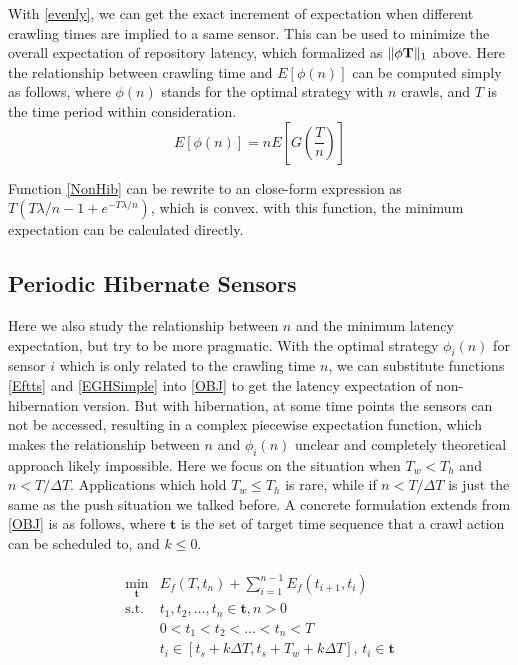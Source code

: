 \documentclass[conference]{IEEEtran}
\begin{document}
With \ref{evenly}, we can get the exact increment of expectation when different crawling times are implied to a same sensor. This can be used to minimize the overall expectation of repository latency, which formalized as $\Arrowvert \phi\mathbf{T} \Arrowvert_{1}$ above.
Here the relationship between crawling time and $E[\phi(n)]$ can be computed simply as follows, where $\phi(n)$ stands for the optimal strategy with $n$ crawls, and $T$ is the time period within consideration. 
\begin{equation}
E[\phi(n)]=nE[G(\frac{T}{n})]\label{NonHib}
\end{equation}


Function \eqref{NonHib} can be rewrite to an close-form expression as $T(T\lambda/n-1+e^{-T\lambda/n})$, which is convex. with this function, the minimum expectation can be calculated directly.

\subsection{Periodic Hibernate Sensors}

Here we also study the relationship between $n$ and the minimum latency expectation, but try to be more pragmatic.
With the optimal strategy $\phi_i(n)$ for sensor $i$ which is only related to the crawling time $n$, we can substitute functions \eqref{Eftts} and \eqref{EGHSimple} into \eqref{OBJ} to get the latency expectation of non-hibernation version. 
But with hibernation, at some time points the sensors can not be accessed, resulting in a complex piecewise expectation function, which makes the relationship between $n$ and $\phi_i(n)$ unclear and completely theoretical approach likely impossible.
Here we focus on the situation when $T_w<T_h$ and $n<T/\Delta T$. Applications which hold $T_w\leq T_h$ is rare, while if $n<T/\Delta T$ is just the same as the push situation we talked before.
A concrete formulation extends from \ref{OBJ} is as follows, where $\mathbf{t}$ is the set of target time sequence that a crawl action can be scheduled to, and $k\leq 0$.

\begin{eqnarray}
\begin{array}{ll}
\min_{\mathbf{t}}& E_f(T,t_n)+\sum_{i=1}^{n-1}E_f(t_{i+1},t_{i}) \\
\text{s.t.} 
&t_1,t_2,\ldots,t_n\in \mathbf{t}, n>0\\
&0<t_1<t_2<\ldots<t_n<T\\
&t_i\in[t_s+k \Delta T, t_s+T_w+k\Delta T]\text{, }t_i\in{\mathbf{t}}
\end{array}\label{OBJext}
\end{eqnarray}
\end{document}
